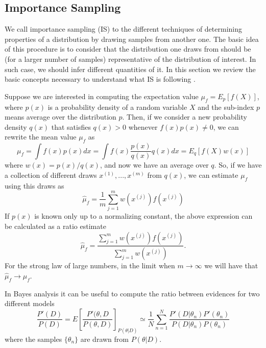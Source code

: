 \documentclass[onecolumn,           %
               showpacs,            %
               preprintnumbers,     %
               aps,                 %
               prl,          	    %
               letterpaper,             %
               superscriptaddress,      %
               nofootinbib,         %
               tightenlines,        %
               floats,floatfix      %
               ,usenatbib,
               ]{revtex4-1}
\begin{document}
\subsection{Importance Sampling}

We call importance sampling (IS) to the different techniques of determining properties of a distribution by drawing samples from another one. The basic idea of this procedure is to consider that the distribution one draws from should be (for a larger number of samples) representative of the distribution of interest. In such case, we should infer different quantities of it. In this section we review the basic concepts necessary to understand what IS is following \cite{importancesampling}.

Suppose we are interested in computing the expectation value $\mu_f=E_p[f(X)]$, where $p(x)$ is a probability density of a random variable $X$ and the sub-index $p$ means average over the distribution $p$. Then, if we consider a new probability density $q(x)$ that satisfies $q(x)>0$ whenever $f(x)p(x)\not = 0$, we can rewrite the mean value $\mu_f$ as
\begin{equation}
\mu_f = \int f(x)p(x)dx=\int f(x)\frac{p(x)}{q(x)}q(x)dx=E_q[f(X)w(x)]
\end{equation}
where $w(x)=p(x)/q(x)$, and now we have an average over $q$. So, if we have a collection of different draws $x^{(1)},...,x^{(m)}$ from $q(x)$, we can estimate $\mu_f$ using this draws as
\begin{equation}
\hat \mu_f = \frac{1}{m}\sum_{j=1}^m w(x^{(j)})f(x^{(j)})
\end{equation}
If $p(x)$ is known only up to a normalizing constant, the above expression can be calculated  as a ratio estimate
\begin{equation}
\hat \mu_f=\frac{\sum_{j=1}^m w(x^{(j)})f(x^{(j)})}{\sum_{j=1}^mw(x^{(j)})}.
\end{equation}
For the strong law of large numbers, in the limit when $m\rightarrow \infty$ we will have that $\hat \mu_f\rightarrow \mu_f$.

In Bayes analysis it can be useful to compute the ratio between evidences for two different models
\begin{equation}\label{importanceratio}
\frac{P'(D)}{P(D)}=E\left[\frac{P'(\theta,D}{P(\theta,D)}\right]_{P(\theta|D)}\simeq \frac{1}{N}\sum_{n=1}^N\frac{P'(D|\theta_n)P'(\theta_n)}{P(D|\theta_n)P(\theta_n)}
\end{equation}
where the samples $\lbrace\theta_n\rbrace$ are drawn from $P(\theta|D)$.
\end{document}
